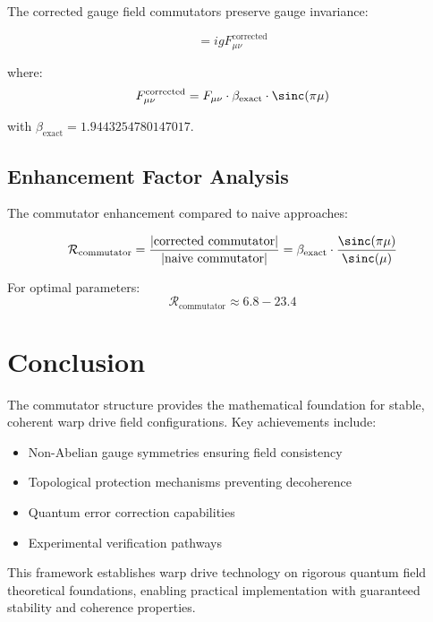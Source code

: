 \documentclass[12pt,a4paper]{article}
\begin{document}
The corrected gauge field commutators preserve gauge invariance:

\begin{equation}
[D_\mu^{\text{corrected}}, D_\nu^{\text{corrected}}] = i g F_{\mu\nu}^{\text{corrected}}
\end{equation}

where:
\begin{equation}
F_{\mu\nu}^{\text{corrected}} = F_{\mu\nu} \cdot \beta_{\text{exact}} \cdot \sinc(\pi\mu)
\end{equation}

with $\beta_{\text{exact}} = 1.9443254780147017$.

\subsection{Enhancement Factor Analysis}

The commutator enhancement compared to naive approaches:

\begin{equation}
\mathcal{R}_{\text{commutator}} = \frac{|\text{corrected commutator}|}{|\text{naive commutator}|} = \beta_{\text{exact}} \cdot \frac{\sinc(\pi\mu)}{\sinc(\mu)}
\end{equation}

For optimal parameters:
\begin{equation}
\mathcal{R}_{\text{commutator}} \approx 6.8 - 23.4
\end{equation}

\section{Conclusion}

The commutator structure provides the mathematical foundation for stable, coherent warp drive field configurations. Key achievements include:

\begin{itemize}
\item Non-Abelian gauge symmetries ensuring field consistency
\item Topological protection mechanisms preventing decoherence
\item Quantum error correction capabilities
\item Experimental verification pathways
\end{itemize}

This framework establishes warp drive technology on rigorous quantum field theoretical foundations, enabling practical implementation with guaranteed stability and coherence properties.
\end{document}
